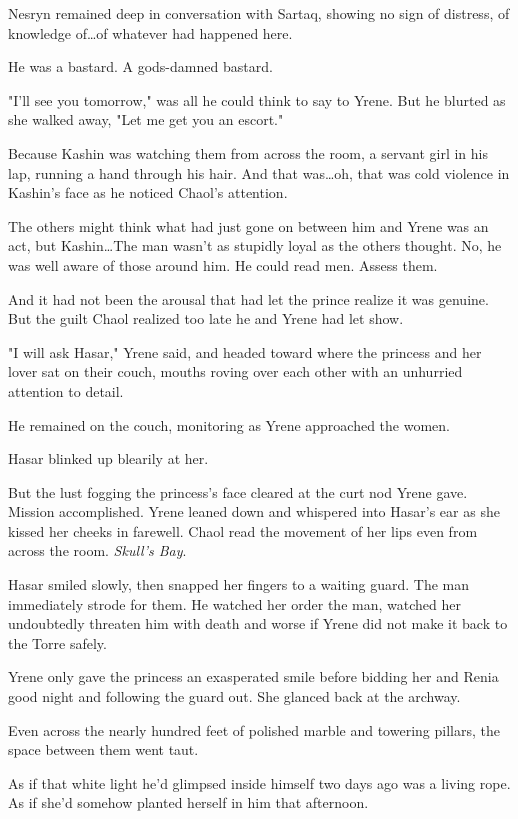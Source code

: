 Nesryn remained deep in conversation with Sartaq, showing no sign of distress, of knowledge of\ldots of whatever had happened here.

He was a bastard.
A gods-damned bastard.

"I'll see you tomorrow," was all he could think to say to Yrene.
But he blurted as she walked away, "Let me get you an escort."

Because Kashin was watching them from across the room, a servant girl in his lap, running a hand through his hair.
And that was\ldots oh, that was cold violence in Kashin's face as he noticed Chaol's attention.

The others might think what had just gone on between him and Yrene was an act, but Kashin\ldots The man wasn't as stupidly loyal as the others thought.
No, he was well aware of those around him.
He could read men.
Assess them.

And it had not been the arousal that had let the prince realize it was genuine.
But the guilt Chaol realized too late he and Yrene had let show.

"I will ask Hasar," Yrene said, and headed toward where the princess and her lover sat on their couch, mouths roving over each other with an unhurried attention to detail.

He remained on the couch, monitoring as Yrene approached the women.

Hasar blinked up blearily at her.

But the lust fogging the princess's face cleared at the curt nod Yrene gave.
Mission accomplished.
Yrene leaned down and whispered into Hasar's ear as she kissed her cheeks in farewell.
Chaol read the movement of her lips even from across the room.
\emph{Skull's Bay}.

Hasar smiled slowly, then snapped her fingers to a waiting guard.
The man immediately strode for them.
He watched her order the man, watched her undoubtedly threaten him with death and worse if Yrene did not make it back to the Torre safely.

Yrene only gave the princess an exasperated smile before bidding her and Renia good night and following the guard out.
She glanced back at the archway.

Even across the nearly hundred feet of polished marble and towering pillars, the space between them went taut.

As if that white light he'd glimpsed inside himself two days ago was a living rope.
As if she'd somehow planted herself in him that afternoon.

